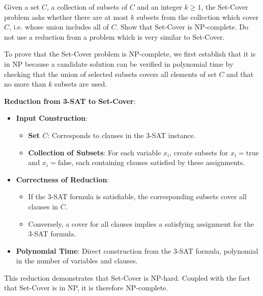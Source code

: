 \problem{}

Given a set $C$, a collection of subsets of $C$ and an integer $k \geq 1$, the Set-Cover problem asks whether there are at most $k$ subsets from the collection which cover $C$, i.e. whose union includes all of $C$. Show that Set-Cover is NP-complete. Do not use a reduction from a problem which is very similar to Set-Cover.

\solution{}

To prove that the Set-Cover problem is NP-complete, we first establish that it is in NP because a candidate solution can be verified in polynomial time by checking that the union of selected subsets covers all elements of set \( C \) and that no more than \( k \) subsets are used.

\textbf{Reduction from 3-SAT to Set-Cover}:
\begin{itemize}
    \item \textbf{Input Construction}:
    \begin{itemize}
        \item \textbf{Set \( C \)}: Corresponds to clauses in the 3-SAT instance.
        \item \textbf{Collection of Subsets}: For each variable \( x_i \), create subsets for \( x_i = \text{true} \) and \( x_i = \text{false} \), each containing clauses satisfied by these assignments.
    \end{itemize}
    \item \textbf{Correctness of Reduction}:
    \begin{itemize}
        \item If the 3-SAT formula is satisfiable, the corresponding subsets cover all clauses in \( C \).
        \item Conversely, a cover for all clauses implies a satisfying assignment for the 3-SAT formula.
    \end{itemize}
    \item \textbf{Polynomial Time}: Direct construction from the 3-SAT formula, polynomial in the number of variables and clauses.
\end{itemize}

This reduction demonstrates that Set-Cover is NP-hard. Coupled with the fact that Set-Cover is in NP, it is therefore NP-complete.




\newpage